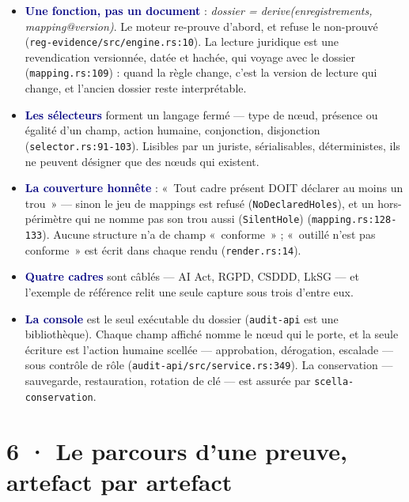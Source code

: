 \documentclass[10pt]{extarticle}
\newcommand{\code}[1]{\texttt{\small #1}}
\newcommand{\loc}[1]{{\footnotesize\color{grey}\texttt{#1}}}
\newcommand{\mm}[1]{\textbf{\textcolor{navy}{#1}}}
\begin{document}
\begin{itemize}[leftmargin=1.2em,itemsep=1.5pt,topsep=1pt]
\item \mm{Une fonction, pas un document} : \emph{dossier = derive(enregistrements, mapping@version)}. Le moteur
re-prouve d'abord, et refuse le non-prouvé (\loc{reg-evidence/\allowbreak src/\allowbreak engine.rs:10}). La lecture
juridique est une revendication versionnée, datée et hachée, qui voyage avec le dossier (\loc{mapping.rs:109}) : quand
la règle change, c'est la version de lecture qui change, et l'ancien dossier reste interprétable.
\item \mm{Les sélecteurs} forment un langage fermé --- type de nœud, présence ou égalité d'un champ, action humaine,
conjonction, disjonction (\loc{selector.rs:91-103}). Lisibles par un juriste, sérialisables, déterministes, ils ne
peuvent désigner que des nœuds qui existent.
\item \mm{La couverture honnête} : «~Tout cadre présent DOIT déclarer au moins un trou~» --- sinon le jeu de mappings
est refusé (\code{NoDeclaredHoles}), et un hors-périmètre qui ne nomme pas son trou aussi (\code{SilentHole})
(\loc{mapping.rs:128-133}). Aucune structure n'a de champ «~conforme~» ; «~outillé n'est pas conforme~» est écrit dans
chaque rendu (\loc{render.rs:14}).
\item \mm{Quatre cadres} sont câblés --- AI Act, RGPD, CSDDD, LkSG --- et l'exemple de référence relit une seule
capture sous trois d'entre eux.
\item \mm{La console} est le seul exécutable du dossier (\code{audit-api} est une bibliothèque). Chaque champ affiché
nomme le nœud qui le porte, et la seule écriture est l'action humaine scellée --- approbation, dérogation, escalade ---
sous contrôle de rôle (\loc{audit-api/\allowbreak src/\allowbreak service.rs:349}). La conservation --- sauvegarde,
restauration, rotation de clé --- est assurée par \code{scella-conservation}.
\end{itemize}

\section{6 · Le parcours d'une preuve, artefact par artefact}
\end{document}

